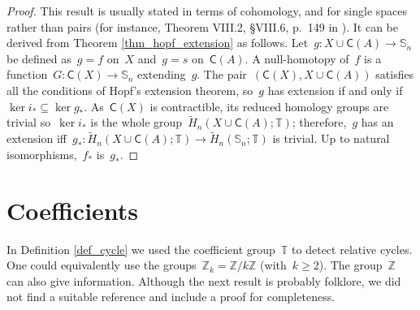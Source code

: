 \documentclass[english,11pt]{article}
\theoremstyle{plain}
\theoremstyle{remark}
\theoremstyle{definition}
\newcommand{\Sp}{\mathbb{S}}
\newcommand{\R}{\mathbb{R}}
\newcommand{\Z}{\mathbb{Z}}
\newcommand{\RZ}{\mathbb{T}}%
\newcommand{\C}[1]{\mathsf{C}(#1)}%
\begin{document}
 \begin{proof}
This result is usually stated in terms of cohomology, and for single spaces rather than pairs (for instance, Theorem VIII.2, \S VIII.6, p.~149 in \cite{HurWal41}). It can be derived from Theorem \ref{thm_hopf_extension} as follows. %
Let~$g:X\cup\C{A}\to\Sp_n$ be defined as~$g=f$ on~$X$ and~$g=s$ on~$\C{A}$. A null-homotopy of~$f$ is a function~$G:\C{X}\to \Sp_n$ extending~$g$. The pair~$(\C{X},X\cup\C{A})$ satisfies all the conditions of Hopf's extension theorem, so~$g$ has extension if and only if~$\ker i_*\subseteq\ker g_*$. As~$\C{X}$ is contractible, its reduced homology groups are trivial so~$\ker i_*$ is the whole group~$\widetilde{H}_n(X\cup \C{A};\RZ)$; therefore,~$g$ has an extension iff~$g_*:\widetilde{H}_n(X\cup\C{A};\RZ)\to \widetilde{H}_n(\Sp_n;\RZ)$ is trivial. Up to natural isomorphisms,~$f_*$ is~$g_*$.
\end{proof}

\section{Coefficients}\label{sec_coef}
In Definition \ref{def_cycle} we used the coefficient group~$\RZ$ to detect relative cycles. One could equivalently use the groups~$\Z_k=\Z/k\Z$ (with~$k\geq 2$). The group~$\Z$ can also give information. Although the next result is probably folklore, we did not find a suitable reference and include a proof for completeness.
\end{document}
